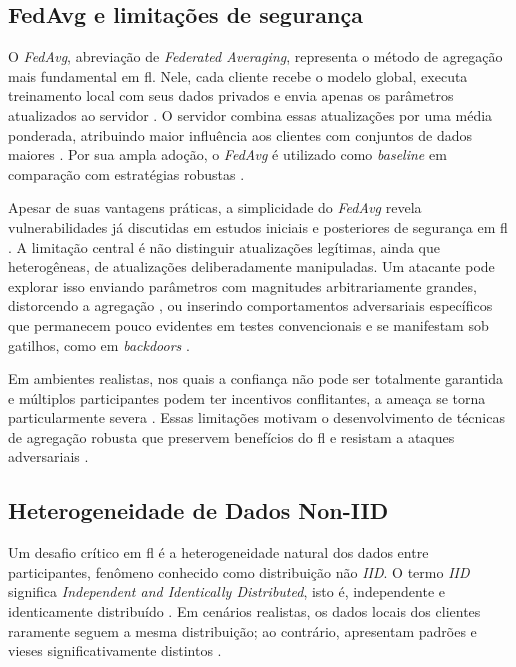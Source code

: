 \subsection{FedAvg e limitações de segurança}
\label{subsec:fedavg-limitacoes}

O \textit{FedAvg}, abreviação de \textit{Federated Averaging}, representa o método de agregação mais fundamental em \gls{fl}. Nele, cada cliente recebe o modelo global, executa treinamento local com seus dados privados e envia apenas os parâmetros atualizados ao servidor \cite{McMahan2017,Yang2019}. O servidor combina essas atualizações por uma média ponderada, atribuindo maior influência aos clientes com conjuntos de dados maiores \cite{Li2020}. Por sua ampla adoção, o \textit{FedAvg} é utilizado como \textit{baseline} em comparação com estratégias robustas \cite{Kairouz2021}.

Apesar de suas vantagens práticas, a simplicidade do \textit{FedAvg} revela vulnerabilidades já discutidas em estudos iniciais e posteriores de segurança em \gls{fl} \cite{Blanchard2017}. A limitação central é não distinguir atualizações legítimas, ainda que heterogêneas, de atualizações deliberadamente manipuladas. Um atacante pode explorar isso enviando parâmetros com magnitudes arbitrariamente grandes, distorcendo a agregação \cite{Tolpegin2020,Bhagoji2019}, ou inserindo comportamentos adversariais específicos que permanecem pouco evidentes em testes convencionais e se manifestam sob gatilhos, como em \textit{backdoors} \cite{Almutairi2024}.

Em ambientes realistas, nos quais a confiança não pode ser totalmente garantida e múltiplos participantes podem ter incentivos conflitantes, a ameaça se torna particularmente severa \cite{Khan2023,Mothukuri2021}. Essas limitações motivam o desenvolvimento de técnicas de agregação robusta que preservem benefícios do \gls{fl} e resistam a ataques adversariais \cite{Chen2023,Xu2024,Sikandar2023}.

\subsection{Heterogeneidade de Dados Non-IID}
\label{subsec:heterogeneidade-noniid}

Um desafio crítico em \gls{fl} é a heterogeneidade natural dos dados entre participantes, fenômeno conhecido como distribuição não \textit{IID}. O termo \textit{IID} significa \textit{Independent and Identically Distributed}, isto é, independente e identicamente distribuído \cite{Zhao2018}. Em cenários realistas, os dados locais dos clientes raramente seguem a mesma distribuição; ao contrário, apresentam padrões e vieses significativamente distintos \cite{Li2020}.

